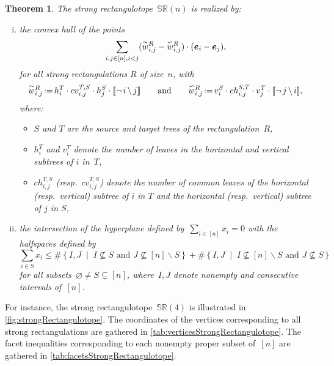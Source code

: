 \documentclass{amsart}
\newtheorem{theorem}{Theorem}%
\theoremstyle{definition}
\newtheorem{example}[theorem]{Example}
\renewcommand{\b}[1]{{\boldsymbol{#1}}} %
\newcommand{\set}[2]{\left\{ #1 \;\middle|\; #2 \right\}} %
\newcommand{\ssm}{\smallsetminus} %
\newcommand{\eqdef}{\mbox{\,\raisebox{0.2ex}{\scriptsize\ensuremath{\mathrm:}}\ensuremath{=}\,}} %
\newcommand{\polytope}[1]{\mathds{#1}} %
\newcommand{\SRP}{\polytope{SR}} %
\newcommand{\yin}[1]{\smash{\overset{\sim}{#1}}}
\newcommand{\yang}[1]{\smash{\overset{\backsim}{#1}}}
\begin{document}
\begin{theorem}
\label{thm:strongRectangulotope}
The strong rectangulotope~$\SRP (n)$ is realized by:
  \begin{enumerate}[(i)]
  \item the convex hull of the points
  \[
  \sum_{i,j\in [n], i< j} (\yin{w}^R_{i,j} - \yang{w}^R_{i,j})\cdot (\b{e}_i - \b{e}_j),
  \]
   for all strong rectangulations $R$ of size~$n$, with
  \[
    \yin{w}^R_{i,j} \eqdef h^T_i \cdot cv^{T,S}_{i,j}\cdot h^S_ j\cdot \llbracket \neg \, i \, \backslash \, j \rrbracket
    \qquad\text{and}\qquad
    \yang{w}^R_{i,j} \eqdef v^S_i \cdot ch^{S,T}_{i,j}\cdot v^T_j \cdot \llbracket \neg \, j \, \backslash \, i \rrbracket,
  \]
 where:
  \begin{itemize}
  \item $S$ and $T$ are the source and target trees of the rectangulation~$R$,
  \item $h^T_i$ and $v^T_i$ denote the number of leaves in the horizontal and vertical subtrees of $i$ in~$T$,
  \item $ch^{T,S}_{i,j}$ (resp.~$cv^{T,S}_{i,j}$) denote the number of common leaves of the horizontal (resp.~vertical) subtree of $i$ in $T$ and the horizontal (resp.~vertical) subtree of $j$ in $S$,
  \end{itemize}
\item the intersection of the hyperplane defined by~$\sum_{i \in [n]} x_i = 0$ with the halfspaces defined by
  \[
  \sum_{i \in S} x_i \le \#\set{I,J}{I \not\subseteq S \text{ and } J \not\subseteq [n] \ssm S} + \#\set{I,J}{I \not\subseteq [n] \ssm S \text{ and } J \not\subseteq S}
  \]
  for all subsets~$\varnothing \ne S \subsetneq [n]$, where~$I,J$ denote nonempty and consecutive intervals of~$[n]$.
  \end{enumerate}
\end{theorem}


For instance, the strong rectangulotope~$\SRP(4)$ is illustrated in \cref{fig:strongRectangulotope}.
The coordinates of the vertices corresponding to all strong rectangulations are gathered in \cref{tab:verticesStrongRectangulotope}.
The facet inequalities corresponding to each nonempty proper subset of~$[n]$ are gathered in \cref{tab:facetsStrongRectangulotope}.
\end{document}
